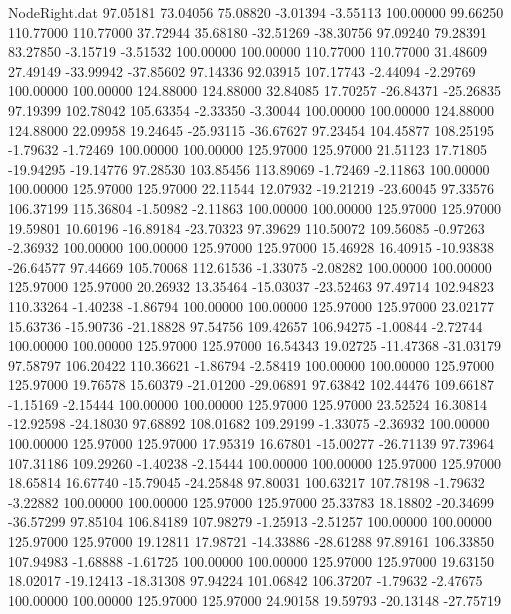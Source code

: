 \begin{filecontents}{NodeRight.dat}
  97.05181   73.04056   75.08820    -3.01394   -3.55113  100.00000   99.66250  110.77000  110.77000   37.72944   35.68180  -32.51269  -38.30756
  97.09240   79.28391   83.27850    -3.15719   -3.51532  100.00000  100.00000  110.77000  110.77000   31.48609   27.49149  -33.99942  -37.85602
  97.14336   92.03915  107.17743    -2.44094   -2.29769  100.00000  100.00000  124.88000  124.88000   32.84085   17.70257  -26.84371  -25.26835
  97.19399  102.78042  105.63354    -2.33350   -3.30044  100.00000  100.00000  124.88000  124.88000   22.09958   19.24645  -25.93115  -36.67627
  97.23454  104.45877  108.25195    -1.79632   -1.72469  100.00000  100.00000  125.97000  125.97000   21.51123   17.71805  -19.94295  -19.14776
  97.28530  103.85456  113.89069    -1.72469   -2.11863  100.00000  100.00000  125.97000  125.97000   22.11544   12.07932  -19.21219  -23.60045
  97.33576  106.37199  115.36804    -1.50982   -2.11863  100.00000  100.00000  125.97000  125.97000   19.59801   10.60196  -16.89184  -23.70323
  97.39629  110.50072  109.56085    -0.97263   -2.36932  100.00000  100.00000  125.97000  125.97000   15.46928   16.40915  -10.93838  -26.64577
  97.44669  105.70068  112.61536    -1.33075   -2.08282  100.00000  100.00000  125.97000  125.97000   20.26932   13.35464  -15.03037  -23.52463
  97.49714  102.94823  110.33264    -1.40238   -1.86794  100.00000  100.00000  125.97000  125.97000   23.02177   15.63736  -15.90736  -21.18828
  97.54756  109.42657  106.94275    -1.00844   -2.72744  100.00000  100.00000  125.97000  125.97000   16.54343   19.02725  -11.47368  -31.03179
  97.58797  106.20422  110.36621    -1.86794   -2.58419  100.00000  100.00000  125.97000  125.97000   19.76578   15.60379  -21.01200  -29.06891
  97.63842  102.44476  109.66187    -1.15169   -2.15444  100.00000  100.00000  125.97000  125.97000   23.52524   16.30814  -12.92598  -24.18030
  97.68892  108.01682  109.29199    -1.33075   -2.36932  100.00000  100.00000  125.97000  125.97000   17.95319   16.67801  -15.00277  -26.71139
  97.73964  107.31186  109.29260    -1.40238   -2.15444  100.00000  100.00000  125.97000  125.97000   18.65814   16.67740  -15.79045  -24.25848
  97.80031  100.63217  107.78198    -1.79632   -3.22882  100.00000  100.00000  125.97000  125.97000   25.33783   18.18802  -20.34699  -36.57299
  97.85104  106.84189  107.98279    -1.25913   -2.51257  100.00000  100.00000  125.97000  125.97000   19.12811   17.98721  -14.33886  -28.61288
  97.89161  106.33850  107.94983    -1.68888   -1.61725  100.00000  100.00000  125.97000  125.97000   19.63150   18.02017  -19.12413  -18.31308
  97.94224  101.06842  106.37207    -1.79632   -2.47675  100.00000  100.00000  125.97000  125.97000   24.90158   19.59793  -20.13148  -27.75719

\end{filecontents}
